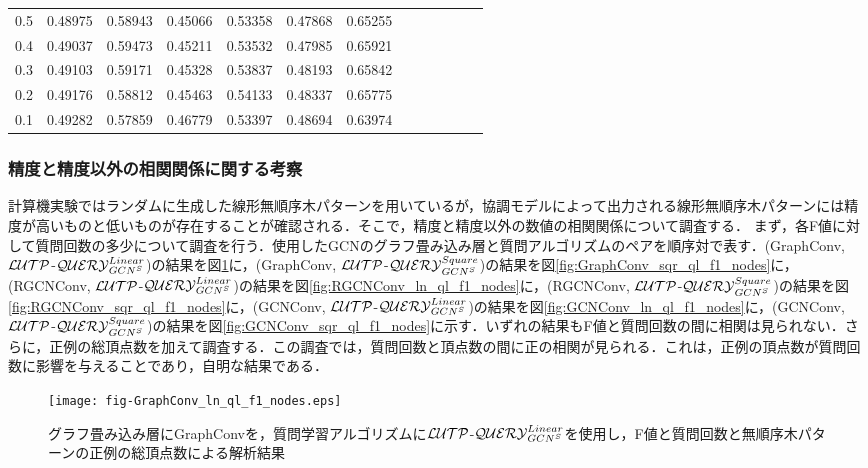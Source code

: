 \begin{table*}[tb]
\begin{tabular}{|c|rr|rr|rr|rr|rr|rr|}
  0.5 &   0.48975 &       0.58943 &       0.45066 &       0.53358 &       0.47868 &       0.65255 \\
  0.4 &   0.49037 &       0.59473 &       0.45211 &       0.53532 &       0.47985 &       0.65921 \\
  0.3 &   0.49103 &       0.59171 &       0.45328 &       0.53837 &       0.48193 &       0.65842 \\
  0.2 &   0.49176 &       0.58812 &       0.45463 &       0.54133 &       0.48337 &       0.65775 \\
  0.1 &   0.49282 &       0.57859 &       0.46779 &       0.53397 &       0.48694 &       0.63974 \\ \hline
\end{tabular}
\end{table*}

\subsubsection*{精度と精度以外の相関関係に関する考察}
計算機実験ではランダムに生成した線形無順序木パターンを用いているが，協調モデルによって出力される線形無順序木パターンには精度が高いものと低いものが存在することが確認される．そこで，精度と精度以外の数値の相関関係について調査する．
まず，各F値に対して質問回数の多少について調査を行う．使用したGCNのグラフ畳み込み層と質問アルゴリズムのペアを順序対で表す．(GraphConv, ${\cal LUTP}$-${\cal QUERY}_{GCN^S}^{Linear}$)の結果を図\ref{fig:GraphConv_ln_ql_f1_nodes}に，(GraphConv, ${\cal LUTP}$-${\cal QUERY}_{GCN^S}^{Square}$)の結果を図\ref{fig:GraphConv_sqr_ql_f1_nodes}に，(RGCNConv, ${\cal LUTP}$-${\cal QUERY}_{GCN^S}^{Linear}$)の結果を図\ref{fig:RGCNConv_ln_ql_f1_nodes}に，(RGCNConv, ${\cal LUTP}$-${\cal QUERY}_{GCN^S}^{Square}$)の結果を図\ref{fig:RGCNConv_sqr_ql_f1_nodes}に，(GCNConv, ${\cal LUTP}$-${\cal QUERY}_{GCN^S}^{Linear}$)の結果を図\ref{fig:GCNConv_ln_ql_f1_nodes}に，(GCNConv, ${\cal LUTP}$-${\cal QUERY}_{GCN^S}^{Square}$)の結果を図\ref{fig:GCNConv_sqr_ql_f1_nodes}に示す．いずれの結果もF値と質問回数の間に相関は見られない．さらに，正例の総頂点数を加えて調査する．この調査では，質問回数と頂点数の間に正の相関が見られる．これは，正例の頂点数が質問回数に影響を与えることであり，自明な結果である．

\begin{figure*}[tb]
  \centering
  \texttt{[image: fig-GraphConv\_ln\_ql\_f1\_nodes.eps]}
  \caption{グラフ畳み込み層にGraphConvを，質問学習アルゴリズムに${\cal LUTP}$-${\cal QUERY}_{GCN^S}^{Linear}$を使用し，F値と質問回数と無順序木パターンの正例の総頂点数による解析結果}\label{fig:GraphConv_ln_ql_f1_nodes}
\end{figure*}

